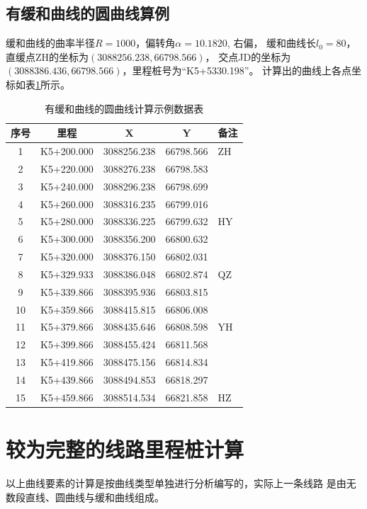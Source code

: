 \subsection{有缓和曲线的圆曲线算例}

缓和曲线的曲率半径$R=1000$，偏转角$\alpha =10.1820$, 右偏，
缓和曲线长$l_0=80$，直缓点ZH的坐标为$(3088256.238, 66798.566)$，
交点JD的坐标为$(3088386.436, 66798.566)$，里程桩号为``K5+5330.198''。
计算出的曲线上各点坐标如表\ref{tab:HYRoute}所示。

\begin{table}[htbp]
\centering
\caption{有缓和曲线的圆曲线计算示例数据表}
\label{tab:HYRoute}
\begin{tabular}{ccccl}
\hline
序号 & 里程	    &        X	   &      Y	   &  备注 \\
\hline
1   & K5+200.000 & 3088256.238 & 66798.566 &  ZH  \\
2   & K5+220.000 & 3088276.238 & 66798.583 &      \\
3   & K5+240.000 & 3088296.238 & 66798.699 &      \\
4   & K5+260.000 & 3088316.235 & 66799.016 &      \\
5   & K5+280.000 & 3088336.225 & 66799.632 &  HY  \\
6   & K5+300.000 & 3088356.200 & 66800.632 &      \\
7   & K5+320.000 & 3088376.150 & 66802.031 &      \\
8   & K5+329.933 & 3088386.048 & 66802.874 &  QZ  \\
9   & K5+339.866 & 3088395.936 & 66803.815 &      \\
10  & K5+359.866 & 3088415.815 & 66806.008 &      \\
11  & K5+379.866 & 3088435.646 & 66808.598 &  YH  \\
12  & K5+399.866 & 3088455.424 & 66811.568 &      \\
13  & K5+419.866 & 3088475.156 & 66814.834 &      \\
14  & K5+439.866 & 3088494.853 & 66818.297 &      \\
15  & K5+459.866 & 3088514.534 & 66821.858 &  HZ  \\
\hline
\end{tabular}

\end{table}

\section{较为完整的线路里程桩计算}

以上曲线要素的计算是按曲线类型单独进行分析编写的，实际上一条线路
是由无数段直线、圆曲线与缓和曲线组成。



